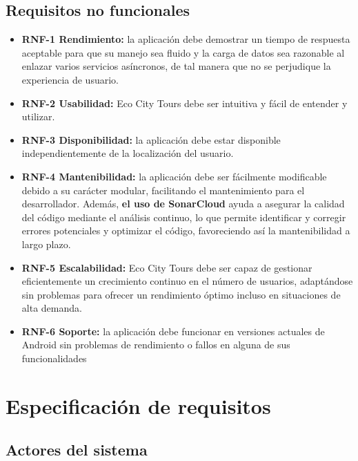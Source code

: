 \subsection{Requisitos no funcionales}
\begin{itemize}
	\item \textbf{RNF-1 Rendimiento:} la aplicación debe demostrar un tiempo de respuesta aceptable para que su manejo sea fluido y la carga de datos sea razonable al enlazar varios servicios asíncronos, de tal manera que no se perjudique la experiencia de usuario. 
	\item \textbf{RNF-2 Usabilidad:} Eco City Tours debe ser intuitiva y fácil de entender y utilizar.
	\item \textbf{RNF-3 Disponibilidad:} la aplicación debe estar disponible independientemente de la localización del usuario.
	\item \textbf{RNF-4 Mantenibilidad:} la aplicación debe ser fácilmente modificable debido a su carácter modular, facilitando el mantenimiento para el desarrollador. Además, \textbf{el uso de SonarCloud} ayuda a asegurar la calidad del código mediante el análisis continuo, lo que permite identificar y corregir errores potenciales y optimizar el código, favoreciendo así la mantenibilidad a largo plazo.
	
	\item \textbf{RNF-5 Escalabilidad:} Eco City Tours debe ser capaz de gestionar eficientemente un crecimiento continuo en el número de usuarios, adaptándose sin problemas para ofrecer un rendimiento óptimo incluso en situaciones de alta demanda.
	\item \textbf{RNF-6 Soporte:} la aplicación debe funcionar en versiones actuales de Android sin problemas de rendimiento o fallos en alguna de sus funcionalidades
\end{itemize}
\clearpage

\section{Especificación de requisitos}

\subsection{Actores del sistema}

